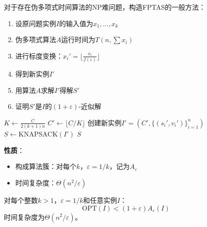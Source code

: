 \documentclass[./../main.tex]{subfiles} %
\begin{document}
对于存在伪多项式时间算法的NP难问题，构造FPTAS的一般方法：
\begin{enumerate}
    \item 设原问题实例$I$的输入值为$x_1,\ldots,x_k$
    \item 伪多项式算法$A$运行时间为$T(n,\sum x_i)$
    \item 进行标度变换：$x_i' = \lfloor \frac{x_i}{f(\varepsilon)} \rfloor$
    \item 得到新实例$I'$
    \item 用算法$A$求解$I'$得解$S'$
    \item 证明$S'$是$I$的$(1+\varepsilon)$-近似解
\end{enumerate}


\begin{algorithm}[H]
\caption{FPTAS for 0-1 Knapsack}
\SetAlgoLined
{}

$K \leftarrow \frac{C}{2(k+1)n}$ \;
$C' \leftarrow \lfloor C/K \rfloor$ \;
创建新实例$I' = (C',\{(s_i',v_i')\}_{i=1}^n)$\;
$S \leftarrow \text{KNAPSACK}(I')$ \;
\Return $S$
\end{algorithm}

\textbf{性质}：
\begin{itemize}
    \item 构成算法簇：对每个$k$，$\varepsilon = 1/k$，记为$A_\varepsilon$
    \item 时间复杂度：$\Theta(n^2/\varepsilon)$
\end{itemize}

\begin{theorem}
对每个整数$k>1$，$\varepsilon=1/k$和任意实例$I$：
$$ \text{OPT}(I) < (1+\varepsilon)A_{\varepsilon}(I) $$
时间复杂度为$\Theta(n^2/\varepsilon)$。
\end{theorem}
\end{document}
